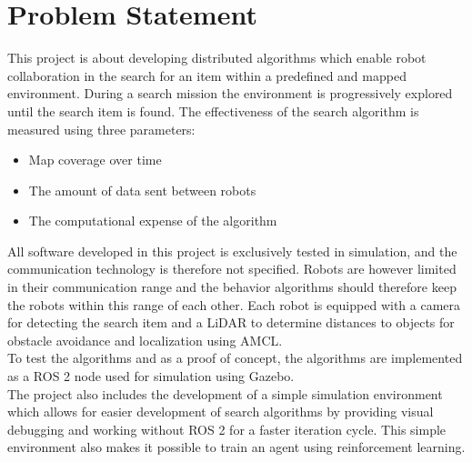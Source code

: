 \section{Problem Statement}
\label{sec:problem-statement}

This project is about developing distributed algorithms which enable robot collaboration in the search for an item within a predefined and mapped environment. During a search mission the environment is progressively explored until the search item is found. The effectiveness of the search algorithm is measured using {\color{red} three} parameters:

\begin{itemize}
    \item Map coverage over time
    \item The amount of data sent between robots
    \item The computational expense of the algorithm
\end{itemize}

All software developed in this project is exclusively tested in simulation, and the communication technology is therefore not specified. Robots are however limited in their communication range and the behavior algorithms should therefore keep the robots within this range of each other. Each robot is equipped with a camera for detecting the search item and a LiDAR to determine distances to objects for obstacle avoidance and localization using AMCL. \\

To test the algorithms and as a proof of concept, the algorithms are implemented as a ROS 2 node used for simulation using Gazebo. \\

The project also includes the development of a simple simulation environment which allows for easier development of search algorithms by providing visual debugging and working without ROS 2 for a faster iteration cycle. This simple environment also makes it possible to train an agent using reinforcement learning.
